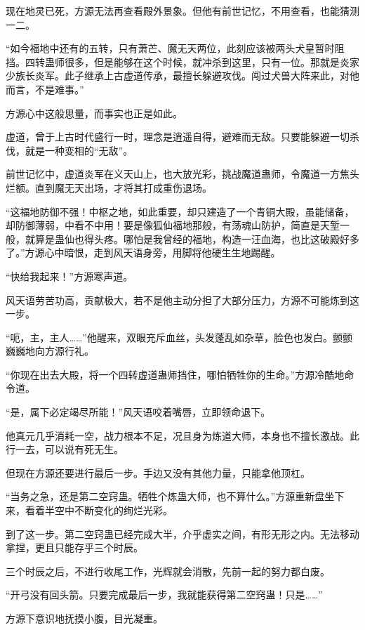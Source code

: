 
\begin{this_body}

现在地灵已死，方源无法再查看殿外景象。但他有前世记忆，不用查看，也能猜测一二。

“如今福地中还有的五转，只有萧芒、魔无天两位，此刻应该被两头犬皇暂时阻挡。四转蛊师很多，但是能够在这个时候，就冲杀到这里，只有一位。那就是炎家少族长炎军。此子继承上古虚道传承，最擅长躲避攻伐。闯过犬兽大阵来此，对他而言，不是难事。”

方源心中这般思量，而事实也正是如此。

虚道，曾于上古时代盛行一时，理念是逍遥自得，避难而无敌。只要能躲避一切杀伐，就是一种变相的“无敌”。

前世记忆中，虚道炎军在义天山上，也大放光彩，挑战魔道蛊师，令魔道一方焦头烂额。直到魔无天出场，才将其打成重伤退场。

“这福地防御不强！中枢之地，如此重要，却只建造了一个青铜大殿，虽能储备，却防御薄弱，中看不中用！要是像狐仙福地那般，有荡魂山防护，简直是天堑一般，就算是蛊仙也得头疼。哪怕是我曾经的福地，构造一汪血海，也比这破殿好多了。”方源心中暗恨，走到风天语身旁，用脚将他硬生生地踢醒。

“快给我起来！”方源寒声道。

风天语劳苦功高，贡献极大，若不是他主动分担了大部分压力，方源不可能炼到这一步。

“呃，主，主人……”他醒来，双眼充斥血丝，头发蓬乱如杂草，脸色也发白。颤颤巍巍地向方源行礼。

“你现在出去大殿，将一个四转虚道蛊师挡住，哪怕牺牲你的生命。”方源冷酷地命令道。

“是，属下必定竭尽所能！”风天语咬着嘴唇，立即领命退下。

他真元几乎消耗一空，战力根本不足，况且身为炼道大师，本身也不擅长激战。此行一去，可以说有死无生。

但现在方源还要进行最后一步。手边又没有其他力量，只能拿他顶杠。

“当务之急，还是第二空窍蛊。牺牲个炼蛊大师，也不算什么。”方源重新盘坐下来，看着半空中不断变化的绚烂光彩。

到了这一步。第二空窍蛊已经完成大半，介乎虚实之间，有形无形之内。无法移动拿捏，更且只能存乎三个时辰。

三个时辰之后，不进行收尾工作，光辉就会消散，先前一起的努力都白废。

“开弓没有回头箭。只要完成最后一步，我就能获得第二空窍蛊！只是……”

方源下意识地抚摸小腹，目光凝重。


\end{this_body}
